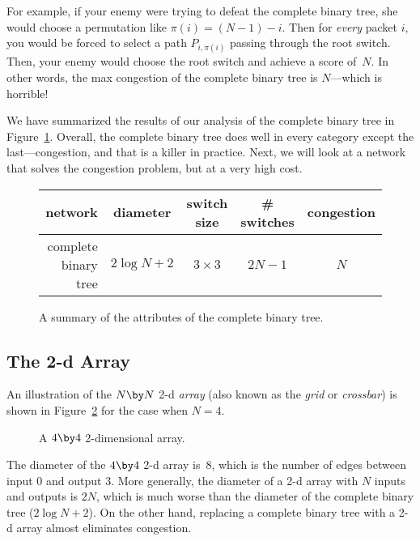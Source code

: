 For example, if your enemy were trying to defeat the complete binary
tree, she would choose a permutation like $\pi(i) = (N - 1) - i$.
Then for \emph{every} packet $i$, you would be forced to select a path
$P_{i, \pi(i)}$ passing through the root switch.  Then, your enemy
would choose the root switch and achieve a score of~$N$.  In other
words, the max congestion of the complete binary tree is $N$---which
is horrible!

We have summarized the results of our analysis of the complete binary
tree in Figure~\ref{fig:6EK}.  Overall, the complete binary tree does
well in every category except the last---congestion, and that is a
killer in practice.  Next, we will look at a network that solves the
congestion problem, but at a very high cost.

\begin{figure}

\begin{tabular}{r|c|c|c|c}
\textbf{network} &
\textbf{diameter} &
\textbf{switch size} &
\textbf{\# switches} &
\textbf{congestion} \\ \hline
complete binary tree & $2 \log N + 2$ & $3 \times 3$ & $2N - 1$ & $N$
\end{tabular}

\caption{A summary of the attributes of the complete binary tree.}

\label{fig:6EK}

\end{figure}

\subsection{The 2-d Array}\label{sec:2d-array}

An illustration of the $N \by N$ 2-d \emph{array} (also known as the
\emph{grid} or \emph{crossbar}) is shown in Figure~\ref{fig:6EL} for
the case when $N = 4$.

\begin{figure}


\caption{A $4 \by 4$ 2-dimensional array.}

\label{fig:6EL}

\end{figure}

The diameter of the $4 \by 4$ 2-d array is~8, which is the number of
edges between input 0 and output 3.  More generally, the diameter of a
2-d array with $N$ inputs and outputs is $2N$, which is much worse
than the diameter of the complete binary tree ($2 \log N + 2$).  On
the other hand, replacing a complete binary tree with a 2-d array
almost eliminates congestion.

